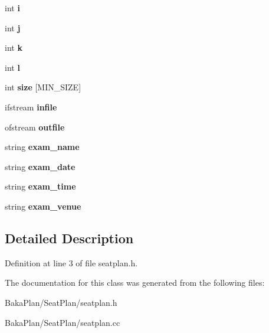 \begin{DoxyCompactItemize}
\item 
\hypertarget{classSeatPlan_aa58731f5bc8a2e44ada7d0f51fc7a58f}{int {\bfseries i}}\label{classSeatPlan_aa58731f5bc8a2e44ada7d0f51fc7a58f}

\item 
\hypertarget{classSeatPlan_ae0d1fd49d01dd90160c5168fc6af41f7}{int {\bfseries j}}\label{classSeatPlan_ae0d1fd49d01dd90160c5168fc6af41f7}

\item 
\hypertarget{classSeatPlan_ab9f49d7c490fb81c6e3a1bad983e4956}{int {\bfseries k}}\label{classSeatPlan_ab9f49d7c490fb81c6e3a1bad983e4956}

\item 
\hypertarget{classSeatPlan_ad3a251bd1922b26e4c0297ae41704656}{int {\bfseries l}}\label{classSeatPlan_ad3a251bd1922b26e4c0297ae41704656}

\item 
\hypertarget{classSeatPlan_a83512de0480711b6c205fc5ed71891d1}{int {\bfseries size} \mbox{[}M\-I\-N\-\_\-\-S\-I\-Z\-E\mbox{]}}\label{classSeatPlan_a83512de0480711b6c205fc5ed71891d1}

\item 
\hypertarget{classSeatPlan_aba400a97d6ed6d615069106ec5db7dc4}{ifstream {\bfseries infile}}\label{classSeatPlan_aba400a97d6ed6d615069106ec5db7dc4}

\item 
\hypertarget{classSeatPlan_a6421c8e8a3a6c56619c4cef8108eca68}{ofstream {\bfseries outfile}}\label{classSeatPlan_a6421c8e8a3a6c56619c4cef8108eca68}

\item 
\hypertarget{classSeatPlan_a2ccc7b524acd261f6dbc19ec57a8c293}{string {\bfseries exam\-\_\-name}}\label{classSeatPlan_a2ccc7b524acd261f6dbc19ec57a8c293}

\item 
\hypertarget{classSeatPlan_a759e103a450eb0fce269b1d99a2beb3d}{string {\bfseries exam\-\_\-date}}\label{classSeatPlan_a759e103a450eb0fce269b1d99a2beb3d}

\item 
\hypertarget{classSeatPlan_a7a1b5a1057a3cd51567f4945a6eef5fc}{string {\bfseries exam\-\_\-time}}\label{classSeatPlan_a7a1b5a1057a3cd51567f4945a6eef5fc}

\item 
\hypertarget{classSeatPlan_a4e623288bfd7887069f69fdf8d233d76}{string {\bfseries exam\-\_\-venue}}\label{classSeatPlan_a4e623288bfd7887069f69fdf8d233d76}

\end{DoxyCompactItemize}


\subsection{Detailed Description}


Definition at line 3 of file seatplan.\-h.



The documentation for this class was generated from the following files\-:\begin{DoxyCompactItemize}
\item 
Baka\-Plan/\-Seat\-Plan/seatplan.\-h\item 
Baka\-Plan/\-Seat\-Plan/seatplan.\-cc\end{DoxyCompactItemize}
